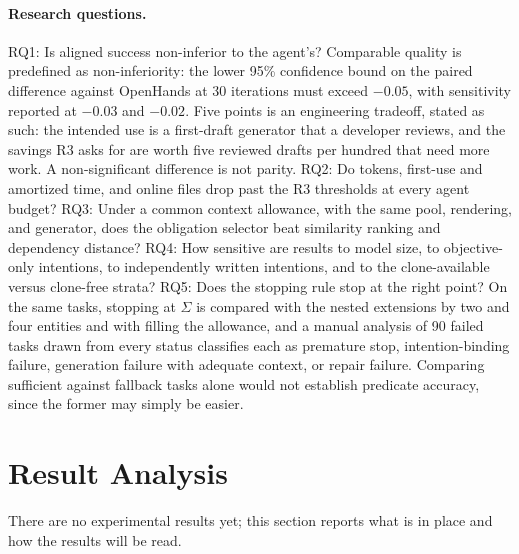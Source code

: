\documentclass[sigconf,nonacm]{acmart}
\newcommand{\suff}{\ensuremath{\Sigma}\xspace}
\begin{document}
\paragraph{Research questions.}
RQ1: Is aligned success non-inferior to the agent's? Comparable quality is predefined as non-inferiority: the lower 95\% confidence bound on the paired difference against OpenHands at 30 iterations must exceed $-0.05$, with sensitivity reported at $-0.03$ and $-0.02$. Five points is an engineering tradeoff, stated as such: the intended use is a first-draft generator that a developer reviews, and the savings R3 asks for are worth five reviewed drafts per hundred that need more work. A non-significant difference is not parity. RQ2: Do tokens, first-use and amortized time, and online files drop past the R3 thresholds at every agent budget? RQ3: Under a common context allowance, with the same pool, rendering, and generator, does the obligation selector beat similarity ranking and dependency distance? RQ4: How sensitive are results to model size, to objective-only intentions, to independently written intentions, and to the clone-available versus clone-free strata? RQ5: Does the stopping rule stop at the right point? On the same tasks, stopping at \suff is compared with the nested extensions by two and four entities and with filling the allowance, and a manual analysis of 90 failed tasks drawn from every status classifies each as premature stop, intention-binding failure, generation failure with adequate context, or repair failure. Comparing sufficient against fallback tasks alone would not establish predicate accuracy, since the former may simply be easier.

\section{Result Analysis}
\label{sec:results}

There are no experimental results yet; this section reports what is in place and how the results will be read.
\end{document}
